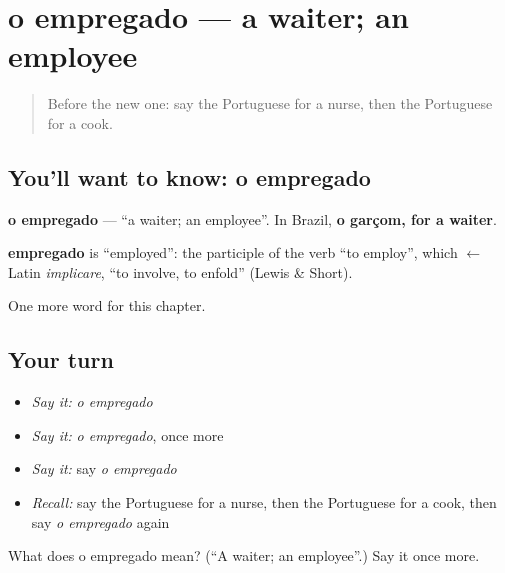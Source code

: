 \section[o empregado]{o empregado — a waiter; an employee}

\label{lesson:PT-C110-empregado}



\begin{quote}
Before the new one: say the Portuguese for a nurse, then the Portuguese for a cook.
\end{quote}

\subsection*{You'll want to know: o empregado}
\textbf{o empregado} — \textquotedblleft{}a waiter; an employee\textquotedblright{}. In Brazil, \textbf{o garçom, for a waiter}.

\begin{cousinweb}
\textbf{empregado} is \textquotedblleft{}employed\textquotedblright{}: the participle of the verb \textquotedblleft{}to employ\textquotedblright{}, which $\leftarrow$ Latin \emph{implicare}, \textquotedblleft{}to involve, to enfold\textquotedblright{} (Lewis \& Short).
\end{cousinweb}

\begin{grammarlens}[title={What you've built}]
One more word for this chapter.
\end{grammarlens}

\subsection*{Your turn}
\begin{itemize}
\raggedright
  \item \emph{Say it:} \emph{o empregado}
  \item \emph{Say it:} \emph{o empregado}, once more
  \item \emph{Say it:} say \emph{o empregado}
  \item \emph{Recall:} say the Portuguese for a nurse, then the Portuguese for a cook, then say \emph{o empregado} again
\end{itemize}

\begin{tcolorbox}[breakable,colback=teal!4,colframe=teal!35!black,title={Before you move on}]
What does o empregado mean? (\textquotedblleft{}A waiter; an employee\textquotedblright{}.) Say it once more.
\end{tcolorbox}
